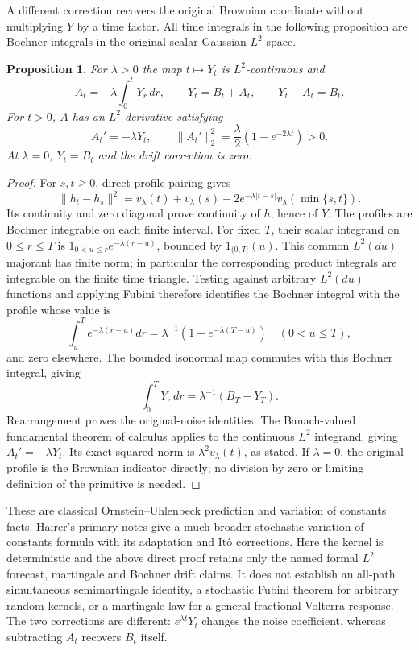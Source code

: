 \documentclass[11pt]{article}
\newtheorem{proposition}[theorem]{Proposition}
\begin{document}
A different correction recovers the original Brownian coordinate
without multiplying $Y$ by a time factor. All time integrals in the
following proposition are Bochner integrals in the original scalar
Gaussian $L^2$ space.
\begin{proposition}\label{prop:ou-drift}
For $\lambda>0$ the map $t\mapsto Y_t$ is $L^2$-continuous and
\[
 A_t=-\lambda\int_0^tY_r\,dr,\qquad
 Y_t=B_t+A_t,\qquad Y_t-A_t=B_t.
\]
For $t>0$, $A$ has an $L^2$ derivative satisfying
\[
 A_t'=-\lambda Y_t,\qquad
 \|A_t'\|_2^2=\frac{\lambda}{2}(1-e^{-2\lambda t})>0.
\]
At $\lambda=0$, $Y_t=B_t$ and the drift correction is zero.
\end{proposition}
\begin{proof}
For $s,t\geq0$, direct profile pairing gives
\[
 \|h_t-h_s\|^2=v_\lambda(t)+v_\lambda(s)
 -2e^{-\lambda|t-s|}v_\lambda(\min\{s,t\}).
\]
Its continuity and zero diagonal prove continuity of $h$, hence of
$Y$. The profiles are Bochner integrable on each finite interval.
For fixed $T$, their scalar integrand on $0\leq r\leq T$ is
$1_{0<u\leq r}e^{-\lambda(r-u)}$, bounded by $1_{(0,T]}(u)$.
This common $L^2(du)$ majorant has finite norm; in particular the
corresponding product integrals are integrable on the finite time
triangle. Testing against arbitrary $L^2(du)$ functions and applying
Fubini therefore identifies the Bochner integral with the profile
whose value is
\[
 \int_u^T e^{-\lambda(r-u)}dr
 =\lambda^{-1}(1-e^{-\lambda(T-u)})\quad(0<u\leq T),
\]
and zero elsewhere. The bounded isonormal map commutes with this
Bochner integral, giving
\[
 \int_0^T Y_r\,dr=\lambda^{-1}(B_T-Y_T).
\]
Rearrangement proves the original-noise identities. The Banach-valued
fundamental theorem of calculus applies to the continuous $L^2$
integrand, giving $A_t'=-\lambda Y_t$. Its exact squared norm is
$\lambda^2v_\lambda(t)$, as stated. If $\lambda=0$, the original
profile is the Brownian indicator directly; no division by zero or
limiting definition of the primitive is needed.
\end{proof}

These are classical Ornstein--Uhlenbeck prediction and variation of
constants facts. Hairer's primary notes \cite[Proposition 4.31,
equation (4.24)]{HairerASA} give a much broader stochastic variation of
constants formula with its adaptation and It\^o corrections. Here
the kernel is deterministic and the above direct proof retains only
the named formal $L^2$ forecast, martingale and Bochner drift claims.
It does not establish an all-path simultaneous semimartingale
identity, a stochastic Fubini theorem for arbitrary random kernels,
or a martingale law for a general fractional Volterra response.
The two corrections are different: $e^{\lambda t}Y_t$ changes the
noise coefficient, whereas subtracting $A_t$ recovers $B_t$ itself.
\end{document}
